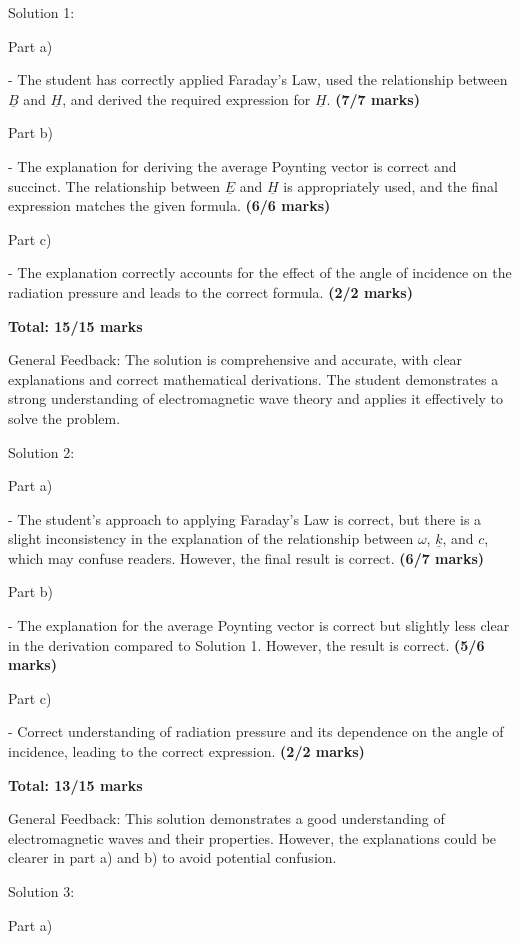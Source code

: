 \documentclass[a4paper,11pt]{article}
\begin{document}
Solution 1:

Part a)

- The student has correctly applied Faraday's Law, used the relationship between \(\underline{B}\) and \(\underline{H}\), and derived the required expression for \(\underline{H}\). \textbf{(7/7 marks)}

Part b)

- The explanation for deriving the average Poynting vector is correct and succinct. The relationship between \(\underline{E}\) and \(\underline{H}\) is appropriately used, and the final expression matches the given formula. \textbf{(6/6 marks)}

Part c)

- The explanation correctly accounts for the effect of the angle of incidence on the radiation pressure and leads to the correct formula. \textbf{(2/2 marks)}

\textbf{Total: 15/15 marks}

General Feedback: The solution is comprehensive and accurate, with clear explanations and correct mathematical derivations. The student demonstrates a strong understanding of electromagnetic wave theory and applies it effectively to solve the problem.

Solution 2:

Part a) 

- The student's approach to applying Faraday's Law is correct, but there is a slight inconsistency in the explanation of the relationship between \(\omega\), \(\underline{k}\), and \(c\), which may confuse readers. However, the final result is correct. \textbf{(6/7 marks)}

Part b)

- The explanation for the average Poynting vector is correct but slightly less clear in the derivation compared to Solution 1. However, the result is correct. \textbf{(5/6 marks)}

Part c)

- Correct understanding of radiation pressure and its dependence on the angle of incidence, leading to the correct expression. \textbf{(2/2 marks)}

\textbf{Total: 13/15 marks}

General Feedback: This solution demonstrates a good understanding of electromagnetic waves and their properties. However, the explanations could be clearer in part a) and b) to avoid potential confusion.

Solution 3:

Part a)
\end{document}
